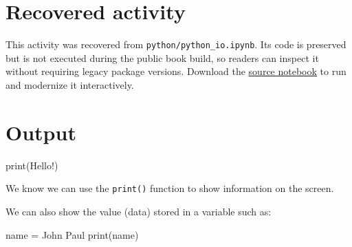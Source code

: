 \documentclass[
  letterpaper,
]{scrbook}
\newenvironment{Shaded}{\begin{snugshade}}{\end{snugshade}}
\newcommand{\BuiltInTok}[1]{\textcolor[rgb]{0.00,0.23,0.31}{#1}}
\newcommand{\NormalTok}[1]{\textcolor[rgb]{0.00,0.23,0.31}{#1}}
\newcommand{\OperatorTok}[1]{\textcolor[rgb]{0.37,0.37,0.37}{#1}}
\newcommand{\StringTok}[1]{\textcolor[rgb]{0.13,0.47,0.30}{#1}}
\begin{document}

\section*{Recovered activity}\label{sec-lab-python-io}


\begin{tcolorbox}[enhanced jigsaw, arc=.35mm, bottomrule=.15mm, bottomtitle=1mm, breakable, colback=white, colbacktitle=quarto-callout-note-color!10!white, colframe=quarto-callout-note-color-frame, coltitle=black, left=2mm, leftrule=.75mm, opacityback=0, opacitybacktitle=0.6, rightrule=.15mm, title=\textcolor{quarto-callout-note-color}{\faInfo}\hspace{0.5em}{Historical source and execution note}, titlerule=0mm, toprule=.15mm, toptitle=1mm]

This activity was recovered from \texttt{python/python\_io.ipynb}. Its
code is preserved but is not executed during the public book build, so
readers can inspect it without requiring legacy package versions.
Download the \href{../notebooks/python-io.ipynb}{source notebook} to run
and modernize it interactively.

\end{tcolorbox}

\section*{Output}\label{output}


\begin{Shaded}
\begin{Highlighting}[]
\BuiltInTok{print}\NormalTok{(}\StringTok{\textquotesingle{}Hello!\textquotesingle{}}\NormalTok{)}
\end{Highlighting}
\end{Shaded}

We know we can use the \texttt{print()} function to show information on
the screen.

We can also show the value (data) stored in a variable such as:

\begin{Shaded}
\begin{Highlighting}[]
\NormalTok{name }\OperatorTok{=} \StringTok{\textquotesingle{}John Paul\textquotesingle{}}
\BuiltInTok{print}\NormalTok{(name)}
\end{Highlighting}
\end{Shaded}
\end{document}
